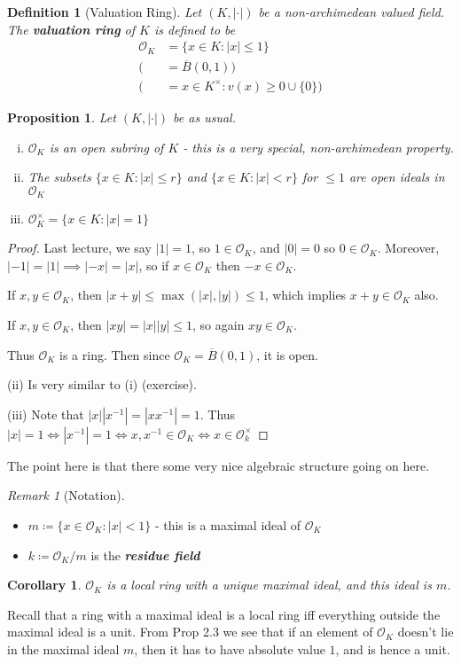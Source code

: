 \documentclass[]{article}
\theoremstyle{custhm}
\theoremstyle{cusdef}
\newtheorem{defin}[theorem]{Definition}
\theoremstyle{custhm}
\theoremstyle{custhm}
\newtheorem{cor}[theorem]{Corollary}
\theoremstyle{custhm}
\newtheorem{prop}[theorem]{Proposition}
\theoremstyle{custhm}
\theoremstyle{cusdef}
\theoremstyle{remark}
\newtheorem*{remark*}{Remark}
\newcommand{\undf}[1]{\textit{\textbf{#1}}}
\newcommand{\valk}{(K,|\cdot|)}
\renewcommand{\bar}{\overline}
\renewcommand{\O}{\mathcal{O}}
\begin{document}
\begin{defin}[Valuation Ring]
	Let $\valk$ be a non-archimedean valued field. The \undf{valuation ring} of $K$ is defined to be
\begin{align*}
	\O_K &= \{x\in K: |x|\le 1\}\\
	(&= \bar{B}(0,1))\\
	 (&=  x\in K^\times:v(x)\ge 0 \cup\{0\})
	\end{align*}
\end{defin}
\begin{prop} Let $\valk$ be as usual.
\begin{enumerate}[(i)]
	\item $\O_K$ is an open subring of $K$ - this is a very special, non-archimedean property.
	\item The subsets $\{x\in K : |x| \le r\}$ and $\{x \in K : |x| < r\}$ for $\le 1$ are open ideals in $\O_K$
	\item $\O_K^\times = \{x\in K: |x| = 1\}$
\end{enumerate}
\end{prop}
\begin{proof}
Last lecture, we say $|1| = 1$, so $1\in \O_K$, and $|0| = 0$ so $0\in \O_K$. Moreover, $|-1| = |1|\implies |-x| = |x|$, so if $x\in \O_K$ then $-x \in \O_K$.

If $x,y\in \O_K$, then $|x+y|\le \max(|x|,|y|)\le 1$, which implies $x+y\in \O_K$ also.

If $x,y\in \O_K$, then $|xy| = |x||y|\le 1$, so again $xy\in \O_K$.

Thus $\O_K$ is a ring. Then since $\O_K = \bar{B}(0,1)$, it is open.

(ii) Is very similar to (i) (exercise).

(iii) Note that $|x||x^{-1}| = |xx^{-1}| = 1$. Thus $|x| = 1 \iff |x^{-1}| = 1\iff x,x^{-1} \in \O_K \iff x \in \O_k^\times$
\end{proof}

The point here is that there some very nice algebraic structure going on here.

\begin{remark*}[Notation]
\begin{itemize}
	\item $m\coloneqq \{x\in \O_K : |x| < 1\}$ - this is a maximal ideal of $\O_K$
	\item $k\coloneqq \O_K/m$ is the \undf{residue field}
\end{itemize}
\end{remark*}
\begin{cor}
$\O_K$ is a local ring with a unique maximal ideal, and this ideal is $m$.
\end{cor}
Recall that a ring with a maximal ideal is a local ring iff everything outside the maximal ideal is a unit. From Prop 2.3 we see that if an element of $\O_K$ doesn't lie in the maximal ideal $m$, then it has to have absolute value $1$, and is hence a unit.
\end{document}
